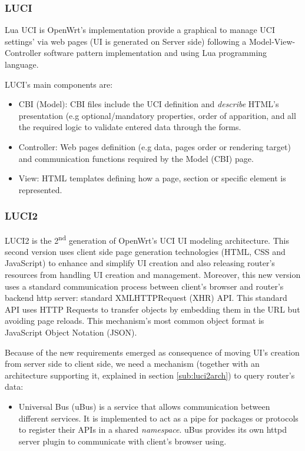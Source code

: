 

\subsubsection{LUCI}
Lua UCI is OpenWrt's implementation provide a graphical to manage UCI settings' via web pages (UI is generated on Server side) following a Model-View-Controller software pattern implementation and using Lua programming language.

LUCI's main components are:
\begin{itemize}
    \item CBI (Model): CBI files include the UCI definition and \textit{describe} HTML's presentation (e.g optional/mandatory properties, order of apparition, and all the required logic to validate entered data through the forms.
    \item Controller: Web pages definition (e.g data, pages order or rendering target) and communication functions required by the Model (CBI) page.
    \item View: HTML templates defining how a page, section or specific element is represented.
\end{itemize}

\subsubsection{LUCI2}
\label{sub:sub:luci2}
LUCI2 is the 2\textsuperscript{nd} generation of OpenWrt's UCI UI modeling architecture. This second version uses client side page generation technologies (HTML, CSS and JavaScript) to enhance and simplify UI creation and also releasing router's resources from handling UI creation and management. Moreover, this new version uses a standard communication process between client's browser and router's backend http server: standard XMLHTTPRequest (XHR) API. This standard API uses HTTP Requests to transfer objects by embedding them in the URL but avoiding page reloads. This mechanism's most common object format is JavaScript Object Notation (JSON).

Because of the new requirements emerged as consequence of moving UI's creation from server side to client side, we need a mechanism (together with an architecture supporting it, explained in section \ref{sub:luci2arch}) to query router's data:
\begin{itemize}
    \item Universal Bus (uBus) is a service that allows communication between different services. It is implemented to act as a pipe for packages or protocols to register their APIs in a shared \textit{namespace}. uBus provides its own httpd server plugin to communicate with client's browser using.
\end{itemize} 

